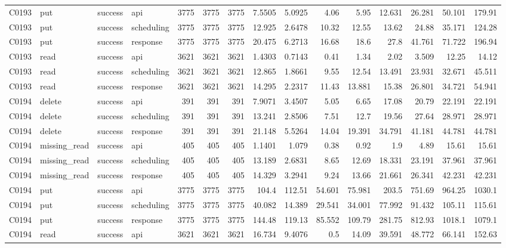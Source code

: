 \begin{landscape}
\begin{longtable}{llllrrrrrrrrrrr}
C0193 & put & success & api & 3775 & 3775 & 3775 & 7.5505 & 5.0925 & 4.06 & 5.95 & 12.631 & 26.281 & 50.101 & 179.91\\
C0193 & put & success & scheduling & 3775 & 3775 & 3775 & 12.925 & 2.6478 & 10.32 & 12.55 & 13.62 & 24.88 & 35.171 & 124.28\\
C0193 & put & success & response & 3775 & 3775 & 3775 & 20.475 & 6.2713 & 16.68 & 18.6 & 27.8 & 41.761 & 71.722 & 196.94\\
C0193 & read & success & api & 3621 & 3621 & 3621 & 1.4303 & 0.7143 & 0.41 & 1.34 & 2.02 & 3.509 & 12.25 & 14.12\\
C0193 & read & success & scheduling & 3621 & 3621 & 3621 & 12.865 & 1.8661 & 9.55 & 12.54 & 13.491 & 23.931 & 32.671 & 45.511\\
C0193 & read & success & response & 3621 & 3621 & 3621 & 14.295 & 2.2317 & 11.43 & 13.881 & 15.38 & 26.801 & 34.721 & 54.941\\
C0194 & delete & success & api & 391 & 391 & 391 & 7.9071 & 3.4507 & 5.05 & 6.65 & 17.08 & 20.79 & 22.191 & 22.191\\
C0194 & delete & success & scheduling & 391 & 391 & 391 & 13.241 & 2.8506 & 7.51 & 12.7 & 19.56 & 27.64 & 28.971 & 28.971\\
C0194 & delete & success & response & 391 & 391 & 391 & 21.148 & 5.5264 & 14.04 & 19.391 & 34.791 & 41.181 & 44.781 & 44.781\\
C0194 & missing\_\allowbreak{}read & success & api & 405 & 405 & 405 & 1.1401 & 1.079 & 0.38 & 0.92 & 1.9 & 4.89 & 15.61 & 15.61\\
C0194 & missing\_\allowbreak{}read & success & scheduling & 405 & 405 & 405 & 13.189 & 2.6831 & 8.65 & 12.69 & 18.331 & 23.191 & 37.961 & 37.961\\
C0194 & missing\_\allowbreak{}read & success & response & 405 & 405 & 405 & 14.329 & 3.2941 & 9.24 & 13.66 & 21.661 & 26.341 & 42.231 & 42.231\\
C0194 & put & success & api & 3775 & 3775 & 3775 & 104.4 & 112.51 & 54.601 & 75.981 & 203.5 & 751.69 & 964.25 & 1030.1\\
C0194 & put & success & scheduling & 3775 & 3775 & 3775 & 40.082 & 14.389 & 29.541 & 34.001 & 77.992 & 91.432 & 105.11 & 115.61\\
C0194 & put & success & response & 3775 & 3775 & 3775 & 144.48 & 119.13 & 85.552 & 109.79 & 281.75 & 812.93 & 1018.1 & 1079.1\\
C0194 & read & success & api & 3621 & 3621 & 3621 & 16.734 & 9.4076 & 0.5 & 14.09 & 39.591 & 48.772 & 66.141 & 152.63\\

\end{longtable}
\end{landscape}
